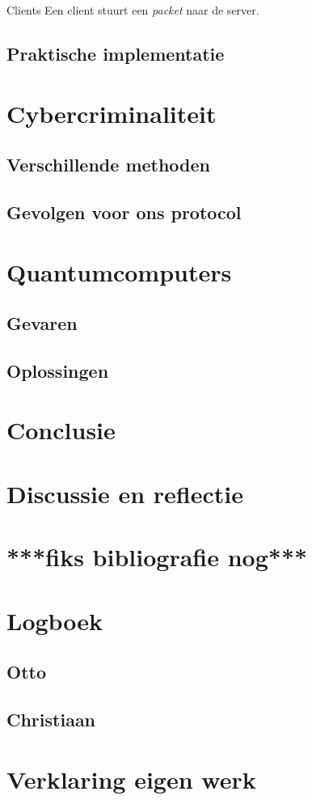 \documentclass{report} %
\begin{document}
Clients 
Een client stuurt een \textit{packet} naar de server. 

\section{Praktische implementatie} %



\chapter{Cybercriminaliteit}

\section{Verschillende methoden}
\section{Gevolgen voor ons protocol}

\chapter{Quantumcomputers}
\section{Gevaren}

\section{Oplossingen}

\chapter{Conclusie}

\chapter{Discussie en reflectie}

\chapter{***fiks bibliografie nog***}
\printbibliography

\chapter{Logboek}
\section{Otto}

\section{Christiaan}


\chapter{Verklaring eigen werk}
\end{document}
